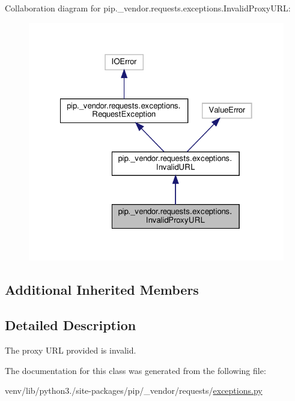 Collaboration diagram for pip.\+\_\+vendor.\+requests.\+exceptions.\+Invalid\+Proxy\+U\+RL\+:
\nopagebreak
\begin{figure}[H]
\begin{center}
\leavevmode
\includegraphics[width=322pt]{classpip_1_1__vendor_1_1requests_1_1exceptions_1_1InvalidProxyURL__coll__graph}
\end{center}
\end{figure}
\subsection*{Additional Inherited Members}


\subsection{Detailed Description}
\begin{DoxyVerb}The proxy URL provided is invalid.\end{DoxyVerb}
 

The documentation for this class was generated from the following file\+:\begin{DoxyCompactItemize}
\item 
venv/lib/python3./site-\/packages/pip/\+\_\+vendor/requests/\hyperlink{pip_2__vendor_2requests_2exceptions_8py}{exceptions.\+py}\end{DoxyCompactItemize}
